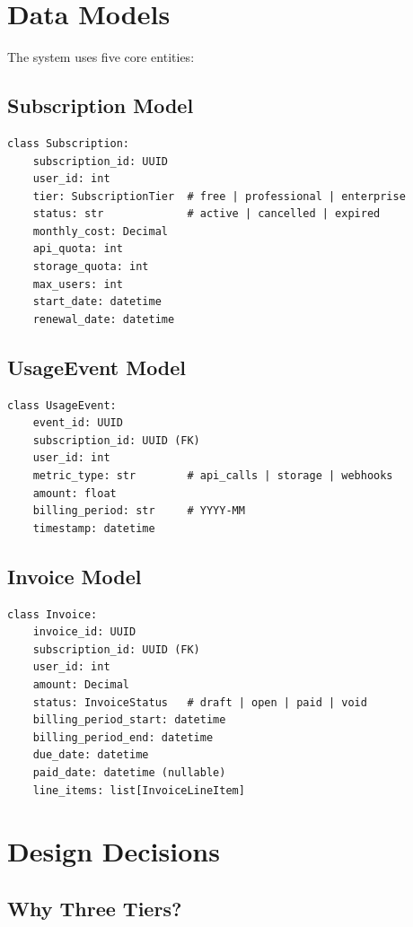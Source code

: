\documentclass[12pt]{report}
\begin{document}
\section{Data Models}

The system uses five core entities:

\subsection{Subscription Model}

\begin{lstlisting}
class Subscription:
    subscription_id: UUID
    user_id: int
    tier: SubscriptionTier  # free | professional | enterprise
    status: str             # active | cancelled | expired
    monthly_cost: Decimal
    api_quota: int
    storage_quota: int
    max_users: int
    start_date: datetime
    renewal_date: datetime
\end{lstlisting}

\subsection{UsageEvent Model}

\begin{lstlisting}
class UsageEvent:
    event_id: UUID
    subscription_id: UUID (FK)
    user_id: int
    metric_type: str        # api_calls | storage | webhooks
    amount: float
    billing_period: str     # YYYY-MM
    timestamp: datetime
\end{lstlisting}

\subsection{Invoice Model}

\begin{lstlisting}
class Invoice:
    invoice_id: UUID
    subscription_id: UUID (FK)
    user_id: int
    amount: Decimal
    status: InvoiceStatus   # draft | open | paid | void
    billing_period_start: datetime
    billing_period_end: datetime
    due_date: datetime
    paid_date: datetime (nullable)
    line_items: list[InvoiceLineItem]
\end{lstlisting}

\section{Design Decisions}

\subsection{Why Three Tiers?}
\end{document}
